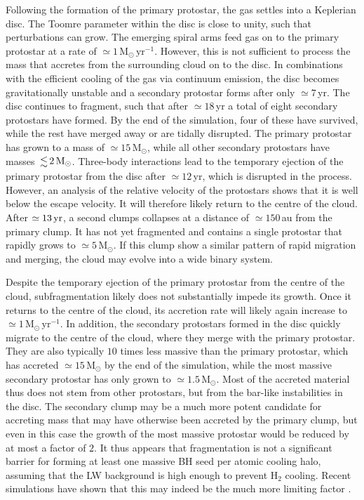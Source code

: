 \documentclass[useAMS,usenatbib]{mnras}
\newcommand{\msunyr}{\text{M}_\odot\,\text{yr}^{-1}}
\newcommand{\msun}{\text{M}_\odot}
\begin{document}
Following the formation of the primary protostar, the gas settles into a Keplerian disc. The Toomre parameter within the disc is close to unity, such that perturbations can grow. The emerging spiral arms feed gas on to the primary protostar at a rate of $\simeq 1\,\msunyr$. However, this is not sufficient to process the mass that accretes from the surrounding cloud on to the disc. In combinations with the efficient cooling of the gas via continuum emission, the disc becomes gravitationally unstable and a secondary protostar forms after only $\simeq 7\,$yr. The disc continues to fragment, such that after $\simeq 18\,$yr a total of eight secondary protostars have formed. By the end of the simulation, four of these have survived, while the rest have merged away or are tidally disrupted. The primary protostar has grown to a mass of $\simeq 15\,\msun$, while all other secondary protostars have masses $\la 2\,\msun$. Three-body interactions lead to the temporary ejection of the primary protostar from the disc after $\simeq 12\,$yr, which is disrupted in the process. However, an analysis of the relative velocity of the protostars shows that it is well below the escape velocity. It will therefore likely return to the centre of the cloud. After $\simeq 13\,{\rm yr}$, a second clumps collapses at a distance of $\simeq 150\,$au from the primary clump. It has not yet fragmented and contains a single protostar that rapidly grows to $\simeq 5\,\msun$. If this clump show a similar pattern of rapid migration and merging, the cloud may evolve into a wide binary system.

Despite the temporary ejection of the primary protostar from the centre of the cloud, subfragmentation likely does not substantially impede its growth. Once it returns to the centre of the cloud, its accretion rate will likely again increase to $\simeq 1\,\msunyr$. In addition, the secondary protostars formed in the disc quickly migrate to the centre of the cloud, where they merge with the primary protostar. They are also typically $10$ times less massive than the primary protostar, which has accreted $\simeq 15\,\msun$ by the end of the simulation, while the most massive secondary protostar has only grown to $\simeq 1.5\,\msun$. Most of the accreted material thus does not stem from other protostars, but from the bar-like instabilities in the disc. The secondary clump may be a much more potent candidate for accreting mass that may have otherwise been accreted by the primary clump, but even in this case the growth of the most massive protostar would be reduced by at most a factor of $2$. It thus appears that fragmentation is not a significant barrier for forming at least one massive BH seed per atomic cooling halo, assuming that the LW background is high enough to prevent H$_2$ cooling. Recent simulations have shown that this may indeed be the much more limiting factor \citep{Latif_2014a, Latif_2014c, Regan_2014b}.
\end{document}
